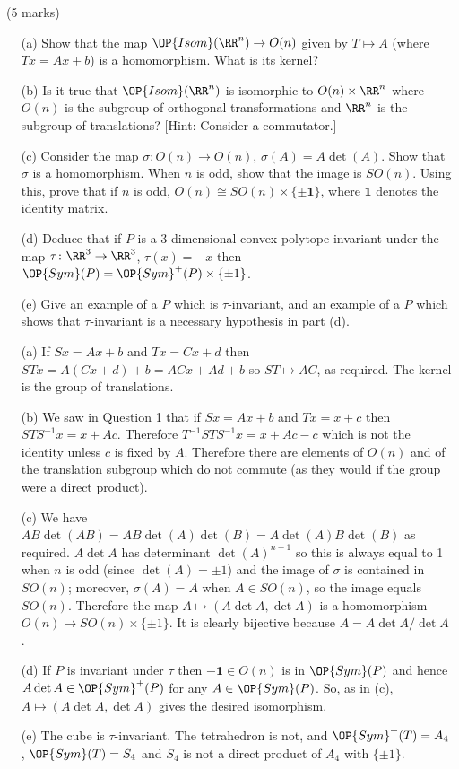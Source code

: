 \documentclass[12pt]{article}
\begin{document}
\begin{question}\ (5 marks)\\
  \begin{enumerate}
  \item[(a)] Show that the map $\OP{Isom}(\RR^n)\to O(n)$ given by $T\mapsto A$ (where $Tx=Ax+b$) is a homomorphism. What is its kernel?
  \item[(b)] Is it true that $\OP{Isom}(\RR^n)$ is isomorphic to $O(n)\times\RR^n$ where $O(n)$ is the subgroup of orthogonal transformations and $\RR^n$ is the subgroup of translations? [Hint: Consider a commutator.]
  \item[(c)] Consider the map $\sigma\colon O(n)\to O(n)$, $\sigma(A)=A\det(A)$. Show that $\sigma$ is a homomorphism. When $n$ is odd, show that the image is $SO(n)$. Using this, prove that if $n$ is odd, $O(n)\cong SO(n)\times\{\pm \mathbf{1}\}$, where $\mathbf{1}$ denotes the identity matrix.
  \item[(d)] Deduce that if $P$ is a 3-dimensional convex polytope invariant under the map $\tau\colon\RR^3\to\RR^3$, $\tau(x)=-x$ then $\OP{Sym}(P)=\OP{Sym}^+(P)\times\{\pm 1\}$.
  \item[(e)] Give an example of a $P$ which is $\tau$-invariant, and an example of a $P$ which shows that $\tau$-invariant is a necessary hypothesis in part (d).
  \end{enumerate}
\end{question}
\begin{answer}
  \begin{enumerate}
  \item[(a)] If $Sx=Ax+b$ and $Tx=Cx+d$ then $STx=A(Cx+d)+b=ACx+Ad+b$ so $ST\mapsto AC$, as required. The kernel is the group of translations.
  \item[(b)] We saw in Question 1 that if $Sx=Ax+b$ and $Tx=x+c$ then $STS^{-1}x=x+Ac$. Therefore $T^{-1}STS^{-1}x=x+Ac-c$ which is not the identity unless $c$ is fixed by $A$. Therefore there are elements of $O(n)$ and of the translation subgroup which do not commute (as they would if the group were a direct product).
  \item[(c)] We have $AB\det(AB)=AB\det(A)\det(B)=A\det(A) B\det(B)$ as required. $A\det A$ has determinant $\det(A)^{n+1}$ so this is always equal to 1 when $n$ is odd (since $\det(A)=\pm 1$) and the image of $\sigma$ is contained in $SO(n)$; moreover, $\sigma(A)=A$ when $A\in SO(n)$, so the image equals $SO(n)$. Therefore the map $A\mapsto (A\det A,\det A)$ is a homomorphism $O(n)\to SO(n)\times\{\pm 1\}$. It is clearly bijective because $A=A\det A/\det A$.
  \item[(d)] If $P$ is invariant under $\tau$ then $-\mathbf{1}\in O(n)$ is in $\OP{Sym}(P)$ and hence $A\det A\in\OP{Sym}^+(P)$ for any $A\in\OP{Sym}(P)$. So, as in (c), $A\mapsto (A\det A,\det A)$ gives the desired isomorphism.
  \item[(e)] The cube is $\tau$-invariant. The tetrahedron is not, and $\OP{Sym}^+(T)=A_4$, $\OP{Sym}(T)=S_4$ and $S_4$ is not a direct product of $A_4$ with $\{\pm 1\}$.
  \end{enumerate}
\end{answer}
\end{document}
